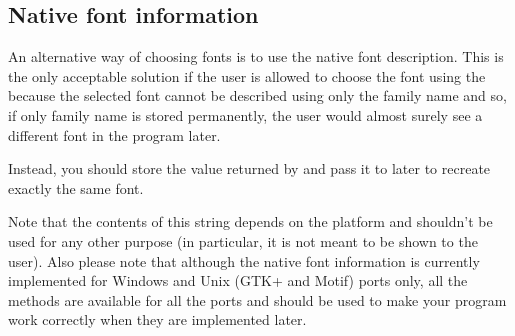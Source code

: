 \subsection{Native font information}\label{nativefontinformation}

An alternative way of choosing fonts is to use the native font description.
This is the only acceptable solution if the user is allowed to choose the font
using the  because the selected font cannot
be described using only the family name and so, if only family name is stored
permanently, the user would almost surely see a different font in the program
later.

Instead, you should store the value returned by 
 and pass
it to  later to
recreate exactly the same font.

Note that the contents of this string depends on the platform and shouldn't be
used for any other purpose (in particular, it is not meant to be shown to the
user). Also please note that although the native font information is currently
implemented for Windows and Unix (GTK+ and Motif) ports only, all the methods
are available for all the ports and should be used to make your program work
correctly when they are implemented later.

